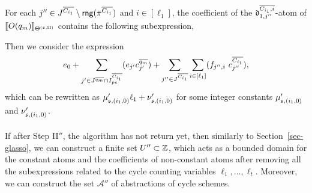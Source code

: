 For each $j'' \in J^{\overline{C_{i_1}}} \setminus \mathsf{rng}(\pi^{\overline{C_{i_1}}})$ and $i \in [\ell_1]$, the coefficient of the $\mathfrak{d}^{\overline{C_{i_1}, i}}_{1, j''}$-atom of $\llbracket O(q_m)\rrbracket_{\Theta^{({\mathfrak{s} },\Omega)}}$ contains the following subexpression, 
\begin{center}
\end{center}

Then we consider the expression 
\[e_0 + \sum \limits_{j' \in J^{\circled{q_m}} \cap I^{\circled{C_{i_1}}}_{pe}} (e_{j'} c^{\circled{q_m}}_{j'}) + \sum \limits_{j'' \in J^{\circled{C_{i_1}}} } \sum \limits_{i \in [\ell_1]} (f_{j'',i}\ c^{\circled{C_{i_1}}}_{j''}),\] 
which can be rewritten as $\mu'_{{\mathfrak{s} },(i_1,0)} \ell_1 + \nu'_{{\mathfrak{s} },(i_1,0)}$ for some integer constants $\mu'_{{\mathfrak{s} }, (i_1,0)}$ and $\nu'_{{\mathfrak{s} }, (i_1,0)}$. 
%
\medskip\\
\smallskip\\

If after Step II$''$, the algorithm has not return yet, then similarly to Section~\ref{sec-glasso}, we can construct a finite set $U'' \subset {\mathbb{Z} }$, which acts as a bounded domain for the constant atoms and the coefficients of non-constant atoms after removing all the subexpressions related to the cycle counting variables $\ell_1,\dots,\ell_t$. Moreover, we can construct the set $\mathscr{A''}$ of abstractions of cycle schemes.
%
\medskip\\
\smallskip\\

